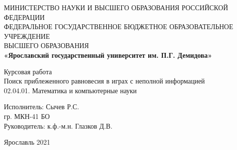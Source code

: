 \begin{center}
	\large{МИНИСТЕРСТВО НАУКИ И ВЫСШЕГО ОБРАЗОВАНИЯ РОССИЙСКОЙ ФЕДЕРАЦИИ}\\
	\footnotesize{ФЕДЕРАЛЬНОЕ ГОСУДАРСТВЕННОЕ БЮДЖЕТНОЕ ОБРАЗОВАТЕЛЬНОЕ УЧРЕЖДЕНИЕ}\\ 
	\footnotesize{ВЫСШЕГО ОБРАЗОВАНИЯ}\\
	\small{\textbf{«Ярославский государственный университет им. П.Г. Демидова»}}\\
	\hfill \break
	\hfill\break
	\hfill \break
	\hfill \break
	\hfill \break
	\hfill \break
	\hfill \break
	\hfill \break
	\hfill \break
	\hfill \break
	
	\normalsize{Курсовая работа}\\
	\large{Поиск приблеженного равновесия в играх с неполной информацией}\\	
	02.04.01. Математика и компьютерные науки\\
	
	\hfill \break
	\hfill \break
	\hfill \break
	\hfill \break
	\hfill \break
\end{center}

\normalsize{ 
	\begin{flushleft}
		\hspace*{80mm}Исполнитель: Сычев Р.С. \\
		\hspace*{80mm}гр. МКН-41 БО \\
		\hspace*{80mm}Руководитель: к.ф.-м.н. Глазков Д.В.
	\end{flushleft}
}
\hfill \break
\hfill \break
\hfill \break
\hfill \break
\hfill \break
\hfill \break
\begin{center} Ярославль 2021 \end{center}
\thispagestyle{empty} %
